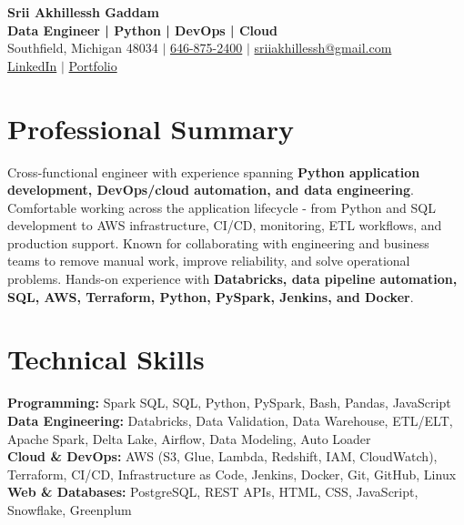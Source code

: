 \documentclass[letterpaper,10pt]{article}
\begin{document}
\fontsize{9.35pt}{10.45pt}\selectfont

\begin{center}
    {\LARGE \textbf{Srii Akhillessh Gaddam}} \\[-1pt]
    \textbf{Data Engineer | Python | DevOps | Cloud} \\[2pt]
    Southfield, Michigan 48034 $|$
    \href{tel:6468752400}{646-875-2400} $|$
    \href{mailto:sriiakhillessh@gmail.com}{sriiakhillessh@gmail.com} \\[1pt]
    \href{https://www.linkedin.com/in/srii-akhiilessh-gaddam-b48668191/}{LinkedIn} $|$
    \href{https://sriiakhillesshg.github.io/portfolio/}{Portfolio}
\end{center}
\vspace{-8pt}

\section{Professional Summary}
\small{Cross-functional engineer with experience spanning \textbf{Python application development, DevOps/cloud automation, and data engineering}. Comfortable working across the application lifecycle - from Python and SQL development to AWS infrastructure, CI/CD, monitoring, ETL workflows, and production support. Known for collaborating with engineering and business teams to remove manual work, improve reliability, and solve operational problems. Hands-on experience with \textbf{Databricks, data pipeline automation, SQL, AWS, Terraform, Python, PySpark, Jenkins, and Docker}.}

\section{Technical Skills}
\small{
\textbf{Programming:} Spark SQL, SQL, Python, PySpark, Bash, Pandas, JavaScript \\
\textbf{Data Engineering:} Databricks, Data Validation, Data Warehouse, ETL/ELT, Apache Spark, Delta Lake, Airflow, Data Modeling, Auto Loader \\
\textbf{Cloud \& DevOps:} AWS (S3, Glue, Lambda, Redshift, IAM, CloudWatch), Terraform, CI/CD, Infrastructure as Code, Jenkins, Docker, Git, GitHub, Linux \\
\textbf{Web \& Databases:} PostgreSQL, REST APIs, HTML, CSS, JavaScript, Snowflake, Greenplum
}
\end{document}
